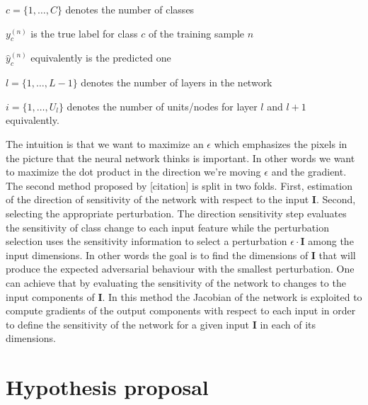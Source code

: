 \documentclass[11pt,twoside,a4paper]{article}
\begin{document}
$c = \{1,\ldots, C\}$ denotes the number of classes

$y_{c}^{\left( n \right)}$ is the true label for class $c$ of the
training sample $n$

$\hat{y}_{c}^{\left( n \right)}$ equivalently is the predicted one

$l = \{1,\ldots, L-1\}$ denotes the number of layers in the network

$i = \{1,\ldots,U_{l}\}$ denotes the number of units/nodes for layer $l$
and $l+1$ equivalently.

The intuition is that we want to maximize an $\epsilon$ which emphasizes the
pixels in the picture that the neural network thinks is important. In
other words we want to maximize the dot product in the direction we're
moving $\epsilon$ and the gradient. The second method proposed by
[citation] is split in two folds. First, estimation of the direction
of sensitivity of the network with respect to the input
$\textbf{I}$. Second, selecting the appropriate perturbation. The
direction sensitivity step evaluates the sensitivity of class change
to each input feature while the perturbation selection uses the
sensitivity information to select a perturbation
$\epsilon\cdot\textbf{I}$ among the input dimensions. In other words the goal is
to find the dimensions of $\textbf{I}$ that will produce the expected
adversarial behaviour with the smallest perturbation. One can achieve
that by evaluating the sensitivity of the network to changes to the
input components of $\textbf{I}$. In this method the Jacobian of the
network is exploited to compute gradients of the output components
with respect to each input in order to define the sensitivity of the
network for a given input $\textbf{I}$ in each of its dimensions.

\section{Hypothesis proposal}
\end{document}
